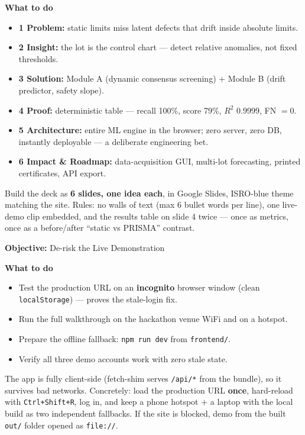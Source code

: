 \documentclass[11pt,a4paper]{article}
\newcommand{\code}[1]{\texttt{\small #1}}
\newcommand{\solution}[1]{\par\vspace{0.4em}\noindent
  \begin{tcolorbox}[colback=solgreen!8,colframe=solgreen,
    title={\sffamily\bfseries\color{white}The Solution},arc=2pt,boxrule=1pt] #1 \end{tcolorbox}\par\vspace{0.6em}}
\newcommand{\phasebox}[3]{\par\vspace{0.8em}\noindent
  \begin{tcolorbox}[colback=isroblue!6,colframe=isroblue,
    title={\sffamily\bfseries\color{white}#1 \quad (#2)},arc=2pt,boxrule=1.2pt]
    \textbf{Objective:} #3%
  \end{tcolorbox}\par\vspace{0.4em}}
\begin{document}
\textbf{What to do}
\begin{itemize}[leftmargin=1.5em]
  \item \textbf{1 Problem:} static limits miss latent defects that drift inside absolute limits.
  \item \textbf{2 Insight:} the lot is the control chart --- detect relative anomalies, not
        fixed thresholds.
  \item \textbf{3 Solution:} Module A (dynamic consensus screening) + Module B
        (drift predictor, safety slope).
  \item \textbf{4 Proof:} deterministic table --- recall 100\%, score 79\%, $R^2$ 0.9999,
        FN $= 0$.
  \item \textbf{5 Architecture:} entire ML engine in the browser; zero server, zero DB,
        instantly deployable --- a deliberate engineering bet.
  \item \textbf{6 Impact \& Roadmap:} data-acquisition GUI, multi-lot forecasting, printed
        certificates, API export.
\end{itemize}

\solution{
  Build the deck as \textbf{6 slides, one idea each}, in Google Slides, ISRO-blue theme
  matching the site. Rules: no walls of text (max 6 bullet words per line), one live-demo
  clip embedded, and the results table on slide 4 twice --- once as metrics, once as a
  before/after ``static vs PRISMA'' contrast.
}

\phasebox{Phase 4}{Hours 10--13}{De-risk the Live Demonstration}

\textbf{What to do}
\begin{itemize}[leftmargin=1.5em]
  \item Test the production URL on an \textbf{incognito} browser window (clean
        \code{localStorage}) --- proves the stale-login fix.
  \item Run the full walkthrough on the hackathon venue WiFi and on a hotspot.
  \item Prepare the offline fallback: \code{npm run dev} from \code{frontend/}.
  \item Verify all three demo accounts work with zero stale state.
\end{itemize}

\solution{
  The app is fully client-side (fetch-shim serves \code{/api/*} from the bundle), so it
  survives bad networks. Concretely: load the production URL \textbf{once}, hard-reload with
  \code{Ctrl+Shift+R}, log in, and keep a phone hotspot + a laptop with the local build as
  two independent fallbacks. If the site is blocked, demo from the built \code{out/} folder
  opened as \code{file://}.
}
\end{document}

